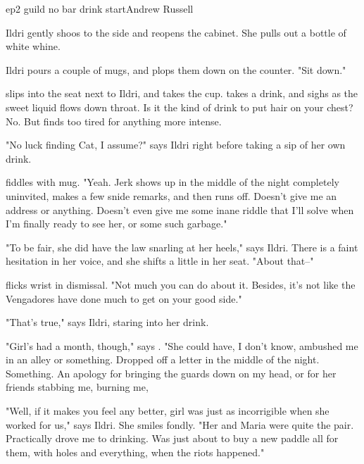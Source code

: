 \documentclass{book}
\begin{document}
\begin{childnode}{ep2 guild no bar drink start}{Andrew Russell}



    Ildri gently shoos \name{} to the side and reopens the cabinet. She pulls out a bottle of white whine.

    Ildri pours a couple of mugs, and plops them down on the counter. "Sit down."

    \name{} slips into the seat next to Ildri, and takes the cup. \HeShe{} takes a drink, and sighs as the sweet liquid flows down \hisher{} throat. Is it the kind of drink to put hair on your chest? No. But \name{} finds \himselfherself{} too tired for anything more intense.

    "No luck finding Cat, I assume?" says Ildri right before taking a sip of her own drink.

    \name{} fiddles with \hisher{} mug. "Yeah. Jerk shows up in the middle of the night completely uninvited, makes a few snide remarks, and then runs off. Doesn't give me an address or anything. Doesn't even give me some inane riddle that I'll solve when I'm
    finally ready to see her, or some such garbage."

    "To be fair, she did have the law snarling at her heels," says Ildri. There is a faint hesitation in her voice, and she shifts a little in her seat. "About that--"

    \name{} flicks \hisher{} wrist in dismissal. "Not much you can do about it. Besides, it's not like the Vengadores have done much to get on your good side."

    "That's true," says Ildri, staring into her drink. 

    "Girl's had a month, though," says \name{}. "She could have, I don't know, ambushed me in an alley or something. Dropped off a letter in the middle of the night. Something. An apology for bringing the guards down on my head, or for her friends 
    stabbing me, burning me, 

    "Well, if it makes you feel any better, girl was just as incorrigible when she worked for us," says Ildri. She smiles fondly. "Her and Maria were quite the pair. Practically drove me to drinking. Was just about to buy a new paddle all for them, with holes
    and everything, when the riots happened."


\end{childnode}
\end{document}
